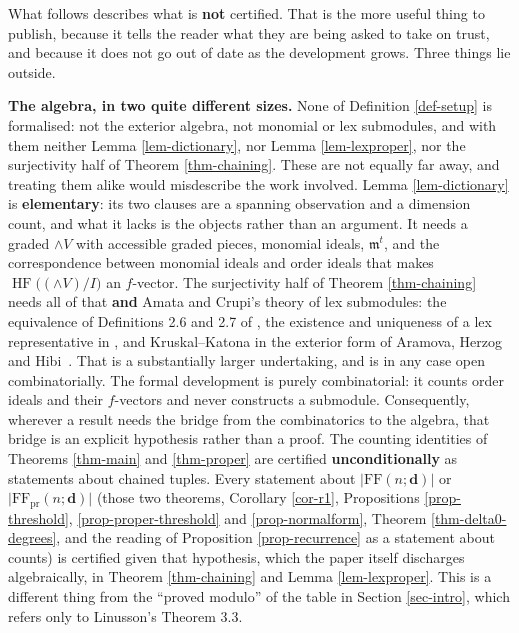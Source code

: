 \documentclass[11pt, a4paper, abstract=yes]{scrartcl}
\theoremstyle{definition}
\theoremstyle{remark}
\theoremstyle{plain}
\newcommand{\vek}[1]{\boldsymbol{#1}}
\newcommand{\HF}{\operatorname{HF}}
\newcommand{\Ext}{\mathord{\wedge }V}
\let\autocite\cite
\begin{document}
\begin{itemize}
What follows describes what is \textbf{not} certified. That is the more useful thing to publish, because
it tells the reader what they are being asked to take on trust, and because it does not go out of
date as the development grows. Three things lie outside.

\textbf{The algebra, in two quite different sizes.} None of Definition \ref{def-setup} is formalised: not
the exterior algebra, not monomial or lex submodules, and with them neither Lemma
\ref{lem-dictionary}, nor Lemma \ref{lem-lexproper}, nor the surjectivity half of Theorem
\ref{thm-chaining}. These are not equally far away, and treating them alike would misdescribe the
work involved. Lemma \ref{lem-dictionary} is \textbf{elementary}: its two clauses are a spanning
observation and a dimension count, and what it lacks is the objects rather than an argument. It
needs a graded \(\Ext\) with accessible graded pieces, monomial ideals, \(\mathfrak m^t\), and the
correspondence between monomial ideals and order ideals that makes \(\HF\bigl((\Ext)/I\bigr)\) an
\(f\)-vector. The surjectivity half of Theorem \ref{thm-chaining} needs all of that \textbf{and} Amata
and Crupi's theory of lex submodules: the equivalence of Definitions 2.6 and 2.7 of
\autocite{AmataCrupi2020KK}, the
existence and uniqueness of a lex representative in \autocite[Theorem 4.2]{AmataCrupi2020KK}, and Kruskal--Katona in
the exterior form of Aramova, Herzog and Hibi~\cite{AramovaHerzogHibi1997}. That is a substantially larger
undertaking, and is in any case open combinatorially. The formal development is
purely combinatorial: it counts order ideals and their \(f\)-vectors and never constructs a
submodule. Consequently, wherever a result needs the bridge from the combinatorics to the algebra,
that bridge is an explicit hypothesis rather than a proof. The counting identities of Theorems
\ref{thm-main} and \ref{thm-proper} are certified \textbf{unconditionally} as statements about chained
tuples. Every statement about \(\lvert\mathrm{FF}(n;\vek d)\rvert\) or
\(\lvert\mathrm{FF}_{\mathrm{pr}}(n;\vek d)\rvert\) (those two theorems, Corollary \ref{cor-r1},
Propositions \ref{prop-threshold}, \ref{prop-proper-threshold} and \ref{prop-normalform}, Theorem
\ref{thm-delta0-degrees}, and the reading of Proposition \ref{prop-recurrence} as a statement about
counts) is certified given that hypothesis, which the paper itself discharges algebraically, in
Theorem \ref{thm-chaining} and Lemma \ref{lem-lexproper}. This is a different thing from the
``proved modulo'' of the table in Section \ref{sec-intro}, which refers only to Linusson's
Theorem 3.3.


\end{itemize}
\end{document}
